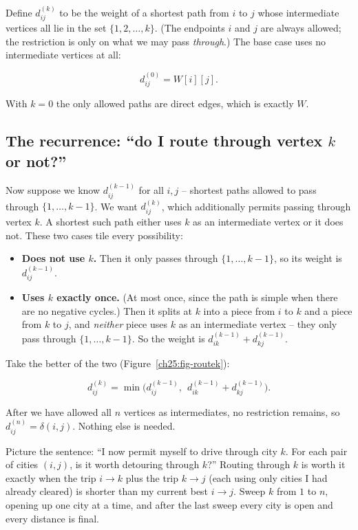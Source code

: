 Define $d^{(k)}_{ij}$ to be the weight of a shortest path from $i$ to $j$ whose
intermediate vertices all lie in the set $\{1, 2, \dots, k\}$. (The endpoints
$i$ and $j$ are always allowed; the restriction is only on what we may pass
\emph{through}.) The base case uses no intermediate vertices at all:

\[
d^{(0)}_{ij} = W[i][j].
\]

With $k = 0$ the only allowed paths are direct edges, which is exactly $W$.

\subsection{The recurrence: ``do I route through vertex $k$ or not?''}

Now suppose we know $d^{(k-1)}_{ij}$ for all $i, j$ -- shortest paths allowed
to pass through $\{1, \dots, k-1\}$. We want $d^{(k)}_{ij}$, which additionally
permits passing through vertex $k$. A shortest such path either uses $k$ as an
intermediate vertex or it does not. These two cases tile every possibility:

\begin{itemize}
\item \textbf{Does not use $k$.} Then it only passes through
$\{1, \dots, k-1\}$, so its weight is $d^{(k-1)}_{ij}$.
\item \textbf{Uses $k$ exactly once.} (At most once, since the path is simple
when there are no negative cycles.) Then it splits at $k$ into a piece from $i$
to $k$ and a piece from $k$ to $j$, and \emph{neither} piece uses $k$ as an
intermediate vertex -- they only pass through $\{1, \dots, k-1\}$. So the
weight is $d^{(k-1)}_{ik} + d^{(k-1)}_{kj}$.
\end{itemize}

Take the better of the two (Figure~\ref{ch25:fig-routek}):

\[
\boxed{\;d^{(k)}_{ij} = \min\big(d^{(k-1)}_{ij},\ \ d^{(k-1)}_{ik} + d^{(k-1)}_{kj}\big).\;}
\]

After we have allowed all $n$ vertices as intermediates, no restriction
remains, so $d^{(n)}_{ij} = \delta(i,j)$. Nothing else is needed.

\begin{intuitionbox}
Picture the sentence: ``I now permit myself to drive through city $k$. For
each pair of cities $(i,j)$, is it worth detouring through $k$?'' Routing
through $k$ is worth it exactly when the trip $i \to k$ plus the trip $k \to j$
(each using only cities I had already cleared) is shorter than my current best
$i \to j$. Sweep $k$ from $1$ to $n$, opening up one city at a time, and after
the last sweep every city is open and every distance is final.
\end{intuitionbox}


